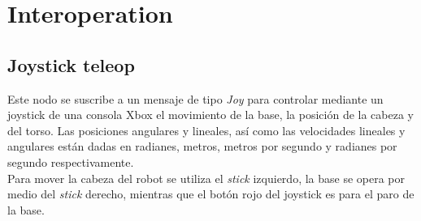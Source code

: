 \documentclass[a4paper,usenames,dvipsnames,svgnames,table]{book}
\begin{document}
\section{Interoperation}

\subsection{Joystick teleop}
Este nodo se suscribe a un mensaje de tipo \textit{Joy} para controlar mediante un joystick de una consola Xbox el movimiento de la base, la posición de la cabeza y del torso. Las posiciones angulares y lineales, así como las velocidades lineales y angulares están dadas en radianes, metros, metros por segundo y radianes por segundo respectivamente.\\

Para mover la cabeza del robot se utiliza el \textit{stick} izquierdo, la base se opera por medio del \textit{stick} derecho, mientras que el botón rojo del joystick es para el paro de la base.\\
\end{document}

